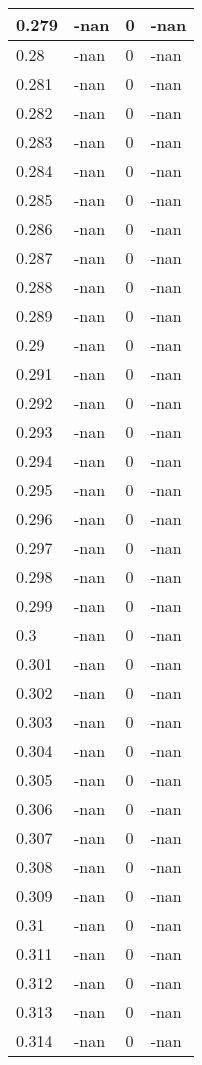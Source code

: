 \documentclass[a4paper,14pt]{extarticle}
\begin{document}
\begin{longtable}{||m{3cm}||m{3cm}|m{3cm}||m{3cm}||}
\hline
0.279 & -nan & 0 & -nan\\
\hline
0.28 & -nan & 0 & -nan\\
\hline
0.281 & -nan & 0 & -nan\\
\hline
0.282 & -nan & 0 & -nan\\
\hline
0.283 & -nan & 0 & -nan\\
\hline
0.284 & -nan & 0 & -nan\\
\hline
0.285 & -nan & 0 & -nan\\
\hline
0.286 & -nan & 0 & -nan\\
\hline
0.287 & -nan & 0 & -nan\\
\hline
0.288 & -nan & 0 & -nan\\
\hline
0.289 & -nan & 0 & -nan\\
\hline
0.29 & -nan & 0 & -nan\\
\hline
0.291 & -nan & 0 & -nan\\
\hline
0.292 & -nan & 0 & -nan\\
\hline
0.293 & -nan & 0 & -nan\\
\hline
0.294 & -nan & 0 & -nan\\
\hline
0.295 & -nan & 0 & -nan\\
\hline
0.296 & -nan & 0 & -nan\\
\hline
0.297 & -nan & 0 & -nan\\
\hline
0.298 & -nan & 0 & -nan\\
\hline
0.299 & -nan & 0 & -nan\\
\hline
0.3 & -nan & 0 & -nan\\
\hline
0.301 & -nan & 0 & -nan\\
\hline
0.302 & -nan & 0 & -nan\\
\hline
0.303 & -nan & 0 & -nan\\
\hline
0.304 & -nan & 0 & -nan\\
\hline
0.305 & -nan & 0 & -nan\\
\hline
0.306 & -nan & 0 & -nan\\
\hline
0.307 & -nan & 0 & -nan\\
\hline
0.308 & -nan & 0 & -nan\\
\hline
0.309 & -nan & 0 & -nan\\
\hline
0.31 & -nan & 0 & -nan\\
\hline
0.311 & -nan & 0 & -nan\\
\hline
0.312 & -nan & 0 & -nan\\
\hline
0.313 & -nan & 0 & -nan\\
\hline
0.314 & -nan & 0 & -nan\\

\end{longtable}
\end{document}
